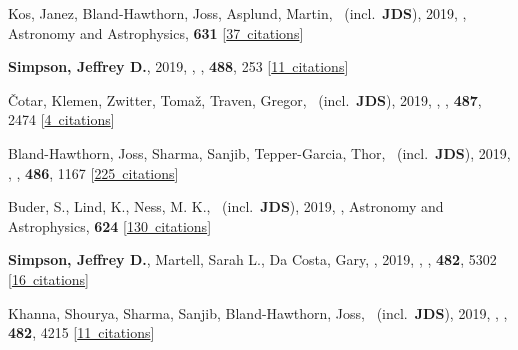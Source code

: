 \item[{\color{numcolor}\scriptsize30}] Kos, Janez, Bland-Hawthorn, Joss, Asplund, Martin, \etal\ (incl.\ \textbf{JDS}), 2019, , Astronomy and Astrophysics, \textbf{631} [\href{https://ui.adsabs.harvard.edu/#abs/2019A&A...631A.166K}{37~citations}]

\item[{\color{numcolor}\scriptsize29}] \textbf{Simpson, Jeffrey D.}, 2019, , \mnras, \textbf{488}, 253 [\href{https://ui.adsabs.harvard.edu/#abs/2019MNRAS.488..253S}{11~citations}]

\item[{\color{numcolor}\scriptsize28}] {\v{C}}otar, Klemen, Zwitter, Toma{\v{z}}, Traven, Gregor, \etal\ (incl.\ \textbf{JDS}), 2019, , \mnras, \textbf{487}, 2474 [\href{https://ui.adsabs.harvard.edu/#abs/2019MNRAS.487.2474C}{4~citations}]

\item[{\color{numcolor}\scriptsize27}] Bland-Hawthorn, Joss, Sharma, Sanjib, Tepper-Garcia, Thor, \etal\ (incl.\ \textbf{JDS}), 2019, , \mnras, \textbf{486}, 1167 [\href{https://ui.adsabs.harvard.edu/#abs/2019MNRAS.486.1167B}{225~citations}]

\item[{\color{numcolor}\scriptsize26}] Buder, S., Lind, K., Ness, M. K., \etal\ (incl.\ \textbf{JDS}), 2019, , Astronomy and Astrophysics, \textbf{624} [\href{https://ui.adsabs.harvard.edu/#abs/2019A&A...624A..19B}{130~citations}]

\item[{\color{numcolor}\scriptsize25}] \textbf{Simpson, Jeffrey D.}, Martell, Sarah L., Da Costa, Gary, \etal, 2019, , \mnras, \textbf{482}, 5302 [\href{https://ui.adsabs.harvard.edu/#abs/2019MNRAS.482.5302S}{16~citations}]

\item[{\color{numcolor}\scriptsize24}] Khanna, Shourya, Sharma, Sanjib, Bland-Hawthorn, Joss, \etal\ (incl.\ \textbf{JDS}), 2019, , \mnras, \textbf{482}, 4215 [\href{https://ui.adsabs.harvard.edu/#abs/2019MNRAS.482.4215K}{11~citations}]

